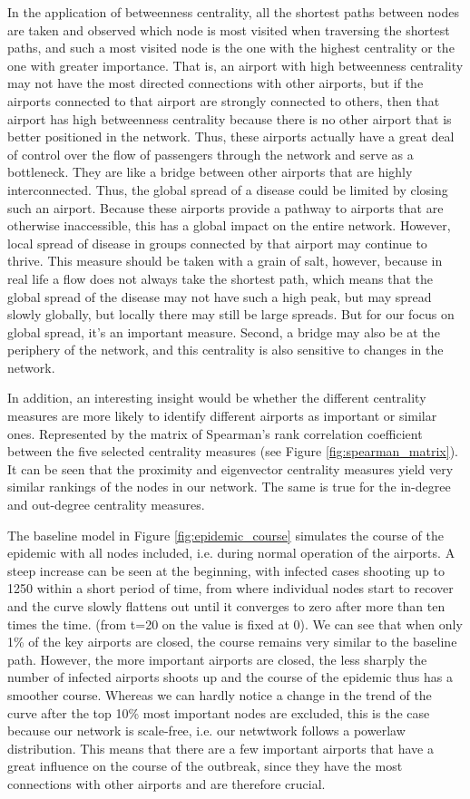\documentclass{Template resources/netsci-project}
\begin{document}
In the application of betweenness centrality, all the shortest paths between nodes are taken and observed which node is most visited when traversing the shortest paths, and such a most visited node is the one with the highest centrality or the one with greater importance. That is, an airport with high betweenness centrality may not have the most directed connections with other airports, but if the airports connected to that airport are strongly connected to others, then that airport has high betweenness centrality because there is no other airport that is better positioned in the network. Thus, these airports actually have a great deal of control over the flow of passengers through the network and serve as a bottleneck. They are like a bridge between other airports that are highly interconnected. Thus, the global spread of a disease could be limited by closing such an airport. Because these airports provide a pathway to airports that are otherwise inaccessible, this has a global impact on the entire network. However, local spread of disease in groups connected by that airport may continue to thrive. This measure should be taken with a grain of salt, however, because in real life a flow does not always take the shortest path, which means that the global spread of the disease may not have such a high peak, but may spread slowly globally, but locally there may still be large spreads. But for our focus on global spread, it's an important measure. Second, a bridge may also be at the periphery of the network, and this centrality is also sensitive to changes in the network.

In addition, an interesting insight would be whether the different centrality measures are more likely to identify different airports as important or similar ones. Represented by the matrix of Spearman's rank correlation coefficient between the five selected centrality measures (see Figure \ref{fig:spearman_matrix}). It can be seen that the proximity and eigenvector centrality measures yield very similar rankings of the nodes in our network. The same is true for the in-degree and out-degree centrality measures.

The baseline model in Figure \ref{fig:epidemic_course} simulates the course of the epidemic with all nodes included, i.e. during normal operation of the airports. A steep increase can be seen at the beginning, with infected cases shooting up to 1250 within a short period of time, from where individual nodes start to recover and the curve slowly flattens out until it converges to zero after more than ten times the time. (from t=20 on the value is fixed at 0).
We can see that when only 1\% of the key airports are closed, the course remains very similar to the baseline path. However, the more important airports are closed, the less sharply the number of infected airports shoots up and the course of the epidemic thus has a smoother course. Whereas we can hardly notice a change in the trend of the curve after the top 10\% most important nodes are excluded, this is the case because our network is scale-free, i.e. our netwtwork follows a powerlaw distribution. This means that 
there are a few important airports that have a great influence on the course of the outbreak, since they have the most connections with other airports and are therefore crucial.
\end{document}
